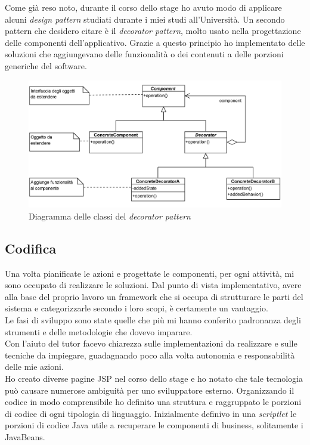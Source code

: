 	Come già reso noto, durante il corso dello stage ho avuto modo di applicare alcuni \textit{design pattern} studiati durante i miei studi all'Università. Un secondo pattern che desidero citare è il \textit{decorator pattern}, molto usato nella progettazione delle componenti dell'applicativo. Grazie a questo principio ho implementato delle soluzioni che aggiungevano delle funzionalità o dei contenuti a delle porzioni generiche del software.
	
	\begin{figure}[H]
		\centering
	   	\includegraphics[width=1\textwidth]{immagini/decorator_pattern}
	   	\caption{Diagramma delle classi del \textit{decorator pattern}}
	\end{figure}
	
	\subsection{Codifica}
	
	Una volta pianificate le azioni e progettate le componenti, per ogni attività, mi sono occupato di realizzare le soluzioni.	Dal punto di vista implementativo, avere alla base del proprio lavoro un framework che si occupa di strutturare le parti del sistema e categorizzarle secondo i loro scopi, è certamente un vantaggio.\\
	
	Le fasi di sviluppo sono state quelle che più mi hanno conferito padronanza degli strumenti e delle metodologie che dovevo imparare.\\
	
	Con l'aiuto del tutor facevo chiarezza sulle implementazioni da realizzare e sulle tecniche da impiegare, guadagnando poco alla volta autonomia e responsabilità delle mie azioni. \\	
	
	Ho creato diverse pagine JSP nel corso dello stage e ho notato che tale tecnologia può causare numerose ambiguità per uno sviluppatore esterno. Organizzando il codice in modo comprensibile ho definito una struttura e raggruppato le porzioni di codice di ogni tipologia di linguaggio.	Inizialmente definivo in una \textit{scriptlet} le porzioni di codice Java utile a recuperare le componenti di business, solitamente i JavaBeans\glossario . 
	
